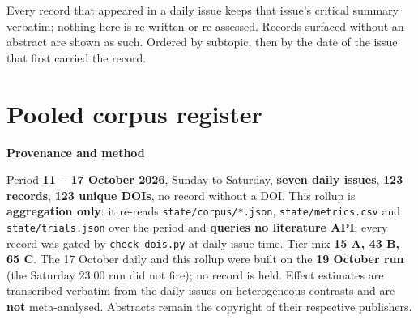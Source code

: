 \documentclass[10pt]{article}
\begin{document}
{\fontsize{7.4}{9}\selectfont\color{Slate}Every record that appeared in a daily issue
keeps that issue's critical summary verbatim; nothing here is re-written or re-assessed.
Records surfaced without an abstract are shown as such. Ordered by subtopic, then by the
date of the issue that first carried the record.\par}



\section*{\sffamily\bfseries\color{Deep}Pooled corpus register}
\vspace{-1.5mm}{\color{Teal}\rule{\linewidth}{1.1pt}}\vspace{2.5mm}



\vspace{4mm}
\begin{keybox}
{\sffamily\bfseries\footnotesize\color{Deep}Provenance and method}\\[1.2mm]
{\fontsize{7.2}{8.8}\selectfont
Period \textbf{11 -- 17 October 2026}, Sunday to Saturday, \textbf{seven daily issues},
\textbf{123 records}, \textbf{123 unique DOIs}, no record without a DOI. This rollup is
\textbf{aggregation only}: it re-reads \texttt{state/corpus/*.json}, \texttt{state/metrics.csv} and
\texttt{state/trials.json} over the period and \textbf{queries no literature API}; every record was gated by
\texttt{check\_dois.py} at daily-issue time. Tier mix \textbf{15 A, 43 B, 65 C}. The 17 October daily and
this rollup were built on the \textbf{19 October run} (the Saturday 23:00 run did not fire); no record is
held. Effect estimates are transcribed verbatim from the daily issues on heterogeneous contrasts and are
\textbf{not} meta-analysed. Abstracts remain the copyright of their respective publishers.\par}
\end{keybox}
\end{document}

